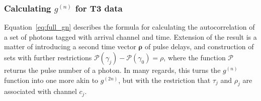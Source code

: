 \documentclass{article}
\newcommand{\parens}[1]{\ensuremath{\left( #1 \right)}}
\newcommand{\gn}[1]{\ensuremath{g^{(#1)}}}
\renewcommand{\vec}{\boldsymbol}
\newcommand{\abs}[1]{\ensuremath{\left|#1\right|}}
\newcommand{\channel}{\ensuremath{c}}
\newcommand{\channels}{\ensuremath{C}}
\newcommand{\photon}{\ensuremath{\gamma}}
\newcommand{\photons}{\ensuremath{\Gamma}}
\newcommand{\Pulse}{\ensuremath{\mathcal{P}}}
\newcommand{\integrationtime}{\ensuremath{\Xi}}
\newcommand{\resolution}{\ensuremath{\epsilon}}
\newcommand{\correlationset}{\ensuremath{G}}
\begin{document}
%

\subsubsection{Calculating \gn{n} for T3 data}
Equation~\ref{eq:full_gn} describes the formula for calculating the autocorrelation of a set of photons tagged with arrival channel and time. Extension of the result is a matter of introducing a second time vector $\vec{\rho}$ of pulse delays, and construction of sets with further restrictions $\Pulse(\photon_{j})-\Pulse(\photon_{0})=\rho$, where the function $\Pulse$ returns the pulse number of a photon. In many regards, this turns the \gn{n} function into one more akin to \gn{2n}, but with the restriction that $\tau_{j}$ and $\rho_{j}$ are associated with channel $\channel_{j}$.
\end{document}
